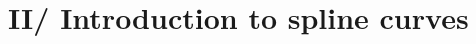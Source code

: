 \documentclass[utf8, a4paper, 11pt]{beamer}
\begin{document}

\frame{\tableofcontents}

\section{II/ Introduction to spline curves}
\end{document}
